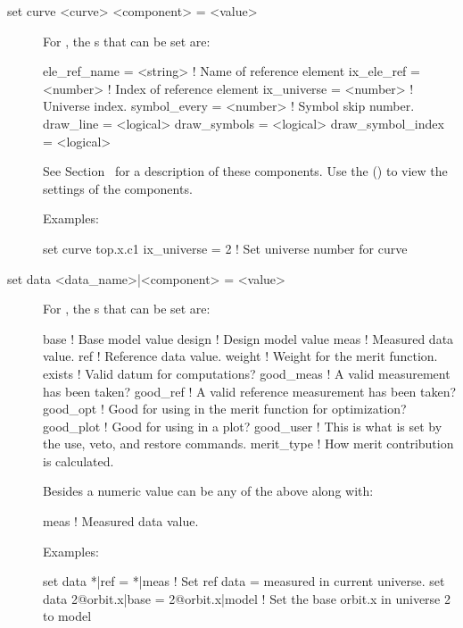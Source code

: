 {{\begin{description}

\item[set curve <curve> <component> = <value>] \Newline
For , the s that can be set are:
\begin{example}
  ele_ref_name      = <string>  ! Name of reference element
  ix_ele_ref        = <number>  ! Index of reference element
  ix_universe       = <number>  ! Universe index.
  symbol_every      = <number>  ! Symbol skip number.
  draw_line         = <logical> 
  draw_symbols      = <logical> 
  draw_symbol_index = <logical> 
\end{example}
See Section~ for a description of these components.
Use the  () to view the settings of the
components.

Examples:
\begin{example}
  set curve top.x.c1 ix_universe = 2  ! Set universe number for curve
\end{example}


\item[set data <data\_name>|<component> = <value>] \Newline
For , the s that can be set are:
\begin{example}
  base        ! Base model value
  design      ! Design model value
  meas        ! Measured data value.
  ref         ! Reference data value.
  weight      ! Weight for the merit function.
  exists      ! Valid datum for computations?
  good_meas   ! A valid measurement has been taken?
  good_ref    ! A valid reference measurement has been taken?
  good_opt    ! Good for using in the merit function for optimization?
  good_plot   ! Good for using in a plot?
  good_user   ! This is what is set by the use, veto, and restore commands.
  merit_type  ! How merit contribution is calculated.
\end{example}
Besides a numeric value  can be any of the above along with:
\begin{example}
  meas        ! Measured data value.
\end{example}

Examples:
\begin{example}
  set data *|ref = *|meas       ! Set ref data = measured in current universe.
  set data 2@orbit.x|base = 2@orbit.x|model 
                                ! Set the base orbit.x in universe 2 to model
\end{example}


\end{description}}}
